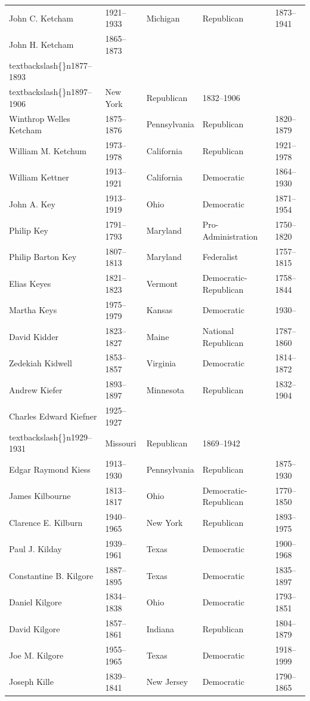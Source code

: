 \documentclass{article}
\begin{document}
\begin{tabular}{lllll}
John C. Ketcham & 1921–1933 & Michigan & Republican & 1873–1941 \\
John H. Ketcham & 1865–1873\\textbackslash\{\}n1877–1893\\textbackslash\{\}n1897–1906 & New York & Republican & 1832–1906 \\
Winthrop Welles Ketcham & 1875–1876 & Pennsylvania & Republican & 1820–1879 \\
William M. Ketchum & 1973–1978 & California & Republican & 1921–1978 \\
William Kettner & 1913–1921 & California & Democratic & 1864–1930 \\
John A. Key & 1913–1919 & Ohio & Democratic & 1871–1954 \\
Philip Key & 1791–1793 & Maryland & Pro-Administration & 1750–1820 \\
Philip Barton Key & 1807–1813 & Maryland & Federalist & 1757–1815 \\
Elias Keyes & 1821–1823 & Vermont & Democratic-Republican & 1758–1844 \\
Martha Keys & 1975–1979 & Kansas & Democratic & 1930– \\
David Kidder & 1823–1827 & Maine & National Republican & 1787–1860 \\
Zedekiah Kidwell & 1853–1857 & Virginia & Democratic & 1814–1872 \\
Andrew Kiefer & 1893–1897 & Minnesota & Republican & 1832–1904 \\
Charles Edward Kiefner & 1925–1927\\textbackslash\{\}n1929–1931 & Missouri & Republican & 1869–1942 \\
Edgar Raymond Kiess & 1913–1930 & Pennsylvania & Republican & 1875–1930 \\
James Kilbourne & 1813–1817 & Ohio & Democratic-Republican & 1770–1850 \\
Clarence E. Kilburn & 1940–1965 & New York & Republican & 1893–1975 \\
Paul J. Kilday & 1939–1961 & Texas & Democratic & 1900–1968 \\
Constantine B. Kilgore & 1887–1895 & Texas & Democratic & 1835–1897 \\
Daniel Kilgore & 1834–1838 & Ohio & Democratic & 1793–1851 \\
David Kilgore & 1857–1861 & Indiana & Republican & 1804–1879 \\
Joe M. Kilgore & 1955–1965 & Texas & Democratic & 1918–1999 \\
Joseph Kille & 1839–1841 & New Jersey & Democratic & 1790–1865 \\

\end{tabular}
\end{document}
